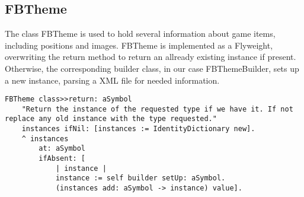 \subsection{FBTheme}
The class FBTheme is used to hold several information about game items, including positions and
images. FBTheme is implemented as a Flyweight, overwriting the return method to return an 
allready existing instance if present. Otherwise, the corresponding builder class, 
in our case FBThemeBuilder, sets up a new instance, parsing a XML file for needed information.

\begin{lstlisting}[language=Smalltalk, label=lst:sweep, caption= FBTheme "return:" method, float]
FBTheme class>>return: aSymbol
    "Return the instance of the requested type if we have it. If not replace any old instance with the type requested."
    instances ifNil: [instances := IdentityDictionary new].
    ^ instances 
        at: aSymbol 
        ifAbsent: [
            | instance |
            instance := self builder setUp: aSymbol.
            (instances add: aSymbol -> instance) value].
\end{lstlisting}
